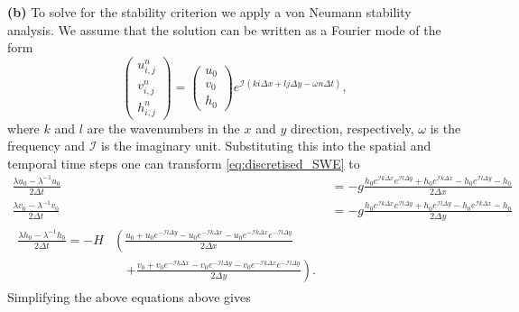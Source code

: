 \textbf{(b)} To solve for the stability criterion we apply a von Neumann stability analysis. We assume that the solution can be written as a Fourier mode of the form
\begin{equation}\begin{pmatrix}
u_{i,j}^{n} \\
v_{i,j}^{n} \\
h_{i,j}^{n}
\end{pmatrix} = \begin{pmatrix}u_0 \\
v_0 \\
h_0
\end{pmatrix} e^{\mathcal{I}(k i \Delta x + l j \Delta y - \omega n \Delta t)},
\end{equation}
where $k$ and $l$ are the wavenumbers in the $x$ and $y$ direction, respectively, $\omega$ is the frequency and $\mathcal{I}$ is the imaginary unit. Substituting this into the spatial and temporal time steps one can transform \autoref{eq:discretised_SWE} to 
\begin{subequations}
\begin{align}
\frac{\lambda u_0 - \lambda^{-1} u_0}{2\Delta t} &= -g \frac{h_0e^{\mathcal{I}k \Delta x}e^{\mathcal{I}l \Delta y}+ h_0e^{\mathcal{I}k\Delta x} - h_0e^{\mathcal{I}l \Delta y}-h_0}{2\Delta x} \\
\frac{\lambda v_0 - \lambda^{-1} v_0}{2\Delta t} &= -g \frac{h_0e^{\mathcal{I}k \Delta x}e^{\mathcal{I}l \Delta y}+ h_0e^{\mathcal{I}l\Delta y} - h_0e^{\mathcal{I}k \Delta x}-h_0}{2\Delta y} \\
\begin{split}
\frac{\lambda h_0 - \lambda^{-1} h_0}{2\Delta t} = - H  &\left( \frac{u_0+u_0e^{-\mathcal{I}l \Delta y} - u_0e^{-\mathcal{I}k \Delta x}- u_0e^{-\mathcal{I}k \Delta x}e^{-\mathcal{I}l \Delta y}}{2\Delta x} \right. \\
&\quad \left. + \frac{v_0+v_0e^{-\mathcal{I}k \Delta x} - v_0e^{-\mathcal{I}l \Delta y}- v_0e^{-\mathcal{I}k \Delta x}e^{-\mathcal{I}l \Delta y}}{2\Delta y} \right).
\end{split}
\end{align}
\label{eq:discretised_SWE_Fourier}
\end{subequations}
Simplifying the above equations above gives
